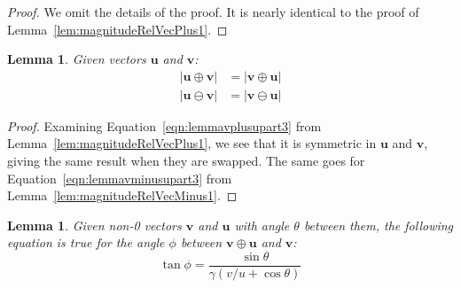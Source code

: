 \documentclass[a4paper]{article}
\theoremstyle{plain}
\newtheorem{lemma}[theorem]{Lemma}
\theoremstyle{definition}
\newcommand{\vect}[1]{\mathbf{#1}}
\begin{document}
\begin{proof}
We omit the details of the proof.  It is nearly identical
to the proof of Lemma~\ref{lem:magnitudeRelVecPlus1}.
\end{proof}

\begin{lemma}
\label{lem:magnitudeRelVecPlusMinus}
Given vectors $\vect{u}$ and $\vect{v}$:
\begin{align*}
|\vect{u} \oplus \vect{v}| & = |\vect{v} \oplus \vect{u}| \\
|\vect{u} \ominus \vect{v}| & = |\vect{v} \ominus \vect{u}|
\end{align*}
\end{lemma}

\begin{proof}
Examining Equation~\eqref{eqn:lemmavplusupart3} from
Lemma~\ref{lem:magnitudeRelVecPlus1}, we see that it is symmetric in
$\vect{u}$ and $\vect{v}$, giving the same result when they are
swapped.
The same goes for Equation~\eqref{eqn:lemmavminusupart3} from
Lemma~\ref{lem:magnitudeRelVecMinus1}.
\end{proof}

\begin{lemma}
\label{lem:angleBetweenVplusUandV}
Given non-0 vectors $\vect{v}$ and $\vect{u}$
with angle $\theta$ between them,
the following equation is true for the angle $\phi$ between
$\vect{v} \oplus \vect{u}$ and $\vect{v}$:
\begin{equation}
\tan \phi = \frac{\sin \theta}{\gamma(v/u + \cos \theta)}
\end{equation}
\end{lemma}
\end{document}
